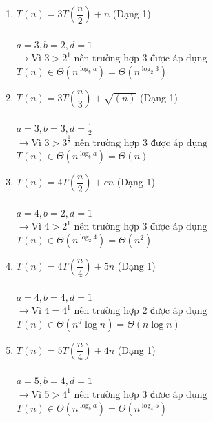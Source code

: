 \documentclass[12pt, letterpaper]{article}
\begin{document}
\begin{enumerate}[label=\bfseries\large\theenumi.]
    \item $ T(n) = 3T\left( \dfrac{n}{2} \right) + n $ (Dạng 1) \\ \\
        $ a = 3, b = 2, d = 1 $ \\
        $ \rightarrow \text{Vì } 3 > 2^1 \text{ nên trường hợp 3 được áp dụng} $ \\
        $ T(n) \in \Theta(n^{\log_b a}) = \Theta(n^{\log_2 3}) $

    \item $ T(n) = 3T\left( \dfrac{n}{3} \right) + \sqrt{(n)} $ (Dạng 1) \\ \\
        $ a = 3, b = 3, d = \frac{1}{2} $ \\
        $ \rightarrow \text{Vì } 3 > 3^{\frac{1}{2}} \text{ nên trường hợp 3 được áp dụng} $ \\
        $ T(n) \in \Theta(n^{\log_b a}) = \Theta(n) $

    \item $ T(n) = 4T\left( \dfrac{n}{2} \right) + cn $ (Dạng 1) \\ \\
        $ a = 4, b = 2, d = 1 $ \\
        $ \rightarrow \text{Vì } 4 > 2^1 \text{ nên trường hợp 3 được áp dụng} $ \\
        $ T(n) \in \Theta(n^{\log_2 4}) = \Theta(n^2) $

    \item $ T(n) = 4T\left( \dfrac{n}{4} \right) + 5n $ (Dạng 1) \\ \\
        $ a = 4, b = 4, d = 1 $ \\
        $ \rightarrow \text{Vì } 4 = 4^1 \text{ nên trường hợp 2 được áp dụng} $ \\
        $ T(n) \in \Theta(n^d \log n) = \Theta(n \log n) $

    \item $ T(n) = 5T\left( \dfrac{n}{4} \right) + 4n $ (Dạng 1) \\ \\
        $ a = 5, b = 4, d = 1 $ \\
        $ \rightarrow \text{Vì } 5 > 4^1 \text{ nên trường hợp 3 được áp dụng} $ \\
        $ T(n) \in \Theta(n^{\log_b a}) = \Theta(n^{\log_4 5}) $
\end{enumerate}
\end{document}
